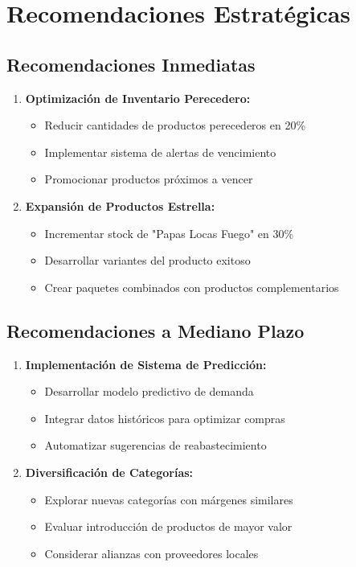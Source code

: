 \documentclass[12pt,a4paper]{article}
\begin{document}
\section{Recomendaciones Estratégicas}

\subsection{Recomendaciones Inmediatas}
\begin{enumerate}
    \item \textbf{Optimización de Inventario Perecedero:}
    \begin{itemize}
        \item Reducir cantidades de productos perecederos en 20\%
        \item Implementar sistema de alertas de vencimiento
        \item Promocionar productos próximos a vencer
    \end{itemize}
    
    \item \textbf{Expansión de Productos Estrella:}
    \begin{itemize}
        \item Incrementar stock de "Papas Locas Fuego" en 30\%
        \item Desarrollar variantes del producto exitoso
        \item Crear paquetes combinados con productos complementarios
    \end{itemize}
\end{enumerate}

\subsection{Recomendaciones a Mediano Plazo}
\begin{enumerate}
    \item \textbf{Implementación de Sistema de Predicción:}
    \begin{itemize}
        \item Desarrollar modelo predictivo de demanda
        \item Integrar datos históricos para optimizar compras
        \item Automatizar sugerencias de reabastecimiento
    \end{itemize}
    
    \item \textbf{Diversificación de Categorías:}
    \begin{itemize}
        \item Explorar nuevas categorías con márgenes similares
        \item Evaluar introducción de productos de mayor valor
        \item Considerar alianzas con proveedores locales
    \end{itemize}
\end{enumerate}
\end{document}
